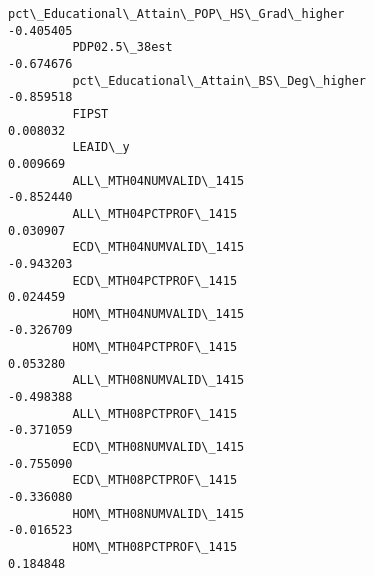 \documentclass[11pt]{article}
\begin{document}
\begin{Verbatim}[commandchars=\\\{\}]
         pct\_Educational\_Attain\_POP\_HS\_Grad\_higher                      -0.405405   
         PDP02.5\_38est                                                  -0.674676   
         pct\_Educational\_Attain\_BS\_Deg\_higher                           -0.859518   
         FIPST                                                           0.008032   
         LEAID\_y                                                         0.009669   
         ALL\_MTH04NUMVALID\_1415                                         -0.852440   
         ALL\_MTH04PCTPROF\_1415                                           0.030907   
         ECD\_MTH04NUMVALID\_1415                                         -0.943203   
         ECD\_MTH04PCTPROF\_1415                                           0.024459   
         HOM\_MTH04NUMVALID\_1415                                         -0.326709   
         HOM\_MTH04PCTPROF\_1415                                           0.053280   
         ALL\_MTH08NUMVALID\_1415                                         -0.498388   
         ALL\_MTH08PCTPROF\_1415                                          -0.371059   
         ECD\_MTH08NUMVALID\_1415                                         -0.755090   
         ECD\_MTH08PCTPROF\_1415                                          -0.336080   
         HOM\_MTH08NUMVALID\_1415                                         -0.016523   
         HOM\_MTH08PCTPROF\_1415                                           0.184848   
         

\end{Verbatim}
\end{document}
